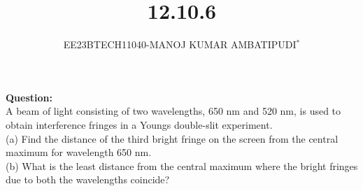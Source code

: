 \documentclass[journal,12pt,twocolumn]{IEEEtran}
\theoremstyle{remark}
\begin{document}

\vspace{3cm}

\title{\textbf{12.10.6}}
\author{EE23BTECH11040-MANOJ KUMAR AMBATIPUDI$^{*}$%
}
\maketitle
\newpage
\bigskip

\renewcommand{\thefigure}{\theenumi}
\renewcommand{\thetable}{\theenumi}

\textbf{Question:}
\\
A beam of light consisting of two wavelengths, 650 nm and 520 nm, is used to
obtain interference fringes in a Youngs double-slit experiment.\\
(a) Find the distance of the third bright fringe on the screen from
the central maximum for wavelength 650 nm.\\
(b) What is the least distance from the central maximum where the
bright fringes due to both the wavelengths coincide?
\\
\end{document}
